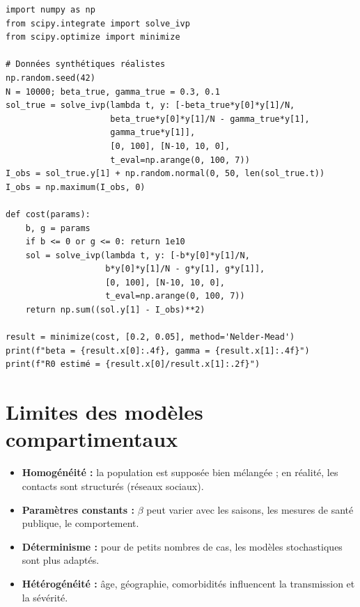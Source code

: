 \begin{codeblock}[title=\textbf{Ajustement SIR \`a des donn\'ees}]
\begin{verbatim}
import numpy as np
from scipy.integrate import solve_ivp
from scipy.optimize import minimize

# Données synthétiques réalistes
np.random.seed(42)
N = 10000; beta_true, gamma_true = 0.3, 0.1
sol_true = solve_ivp(lambda t, y: [-beta_true*y[0]*y[1]/N,
                     beta_true*y[0]*y[1]/N - gamma_true*y[1],
                     gamma_true*y[1]],
                     [0, 100], [N-10, 10, 0],
                     t_eval=np.arange(0, 100, 7))
I_obs = sol_true.y[1] + np.random.normal(0, 50, len(sol_true.t))
I_obs = np.maximum(I_obs, 0)

def cost(params):
    b, g = params
    if b <= 0 or g <= 0: return 1e10
    sol = solve_ivp(lambda t, y: [-b*y[0]*y[1]/N,
                    b*y[0]*y[1]/N - g*y[1], g*y[1]],
                    [0, 100], [N-10, 10, 0],
                    t_eval=np.arange(0, 100, 7))
    return np.sum((sol.y[1] - I_obs)**2)

result = minimize(cost, [0.2, 0.05], method='Nelder-Mead')
print(f"beta = {result.x[0]:.4f}, gamma = {result.x[1]:.4f}")
print(f"R0 estimé = {result.x[0]/result.x[1]:.2f}")
\end{verbatim}
\end{codeblock}

\section{Limites des mod\`eles compartimentaux}

\begin{attention}[title=\textbf{Limites \`a conna\^itre}]
\begin{itemize}
  \item \textbf{Homog\'en\'eit\'e :} la population est suppos\'ee bien
    m\'elang\'ee ; en r\'ealit\'e, les contacts sont structur\'es
    (r\'eseaux sociaux).
  \item \textbf{Param\`etres constants :} $\beta$ peut varier avec les
    saisons, les mesures de sant\'e publique, le comportement.
  \item \textbf{D\'eterminisme :} pour de petits nombres de cas,
    les mod\`eles stochastiques sont plus adapt\'es.
  \item \textbf{H\'et\'erog\'en\'eit\'e :} \^age, g\'eographie, comorbidit\'es
    influencent la transmission et la s\'ev\'erit\'e.
\end{itemize}
\end{attention}

